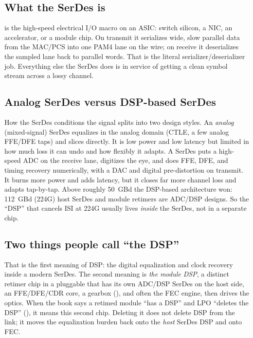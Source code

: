 \subsection{What the SerDes is}

 is the high-speed electrical I/O macro on an ASIC: switch silicon, a
NIC, an accelerator, or a module chip. On transmit it serializes wide, slow
parallel data from the MAC/PCS into one PAM4 lane on the wire; on receive it
deserializes the sampled lane back to parallel words. That is the literal
serializer/deserializer job. Everything else the SerDes does is in service of
getting a clean symbol stream across a lossy channel.

\subsection{Analog SerDes versus DSP-based SerDes}

How the SerDes conditions the signal splits into two design styles. An
\emph{analog} (mixed-signal) SerDes equalizes in the analog domain (CTLE, a few
analog FFE/DFE taps) and slices directly. It is low power and low latency but
limited in how much loss it can undo and how flexibly it adapts. A
 SerDes puts a high-speed ADC on the receive
lane, digitizes the eye, and does FFE, DFE, and timing recovery numerically, with
a DAC and digital pre-distortion on transmit. It burns more power and adds
latency, but it closes far more channel loss and adapts tap-by-tap. Above roughly
50~GBd the DSP-based architecture won: 112~GBd (224G) host SerDes and module
retimers are ADC/DSP designs. So the ``DSP'' that cancels ISI at 224G usually lives
\emph{inside} the SerDes, not in a separate chip.

\subsection{Two things people call ``the DSP''}

That is the first meaning of DSP: the digital equalization and clock recovery
inside a modern SerDes. The second meaning is \emph{the module DSP}, a distinct
retimer chip in a pluggable that has its own ADC/DSP SerDes on the host side, an
FFE/DFE/CDR core, a gearbox (), and often the FEC engine, then
drives the optics. When the book says a retimed module ``has a DSP'' and LPO
``deletes the DSP'' (), it means this second chip. Deleting
it does not delete DSP from the link; it moves the equalization burden back onto
the \emph{host} SerDes DSP and onto FEC.

